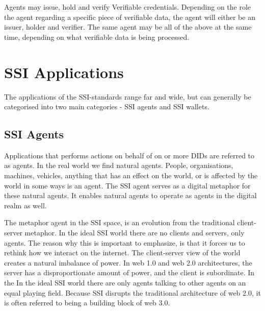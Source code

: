 Agents may issue, hold and verify Verifiable credentials. Depending on
the role the agent regarding a specific piece of verifiable data, the
agent will either be an issuer, holder and verifier. The same agent may
be all of the above at the same time, depending on what verifiable data
is being processed.





\hypertarget{ssi-applications}{%
\section{SSI Applications}\label{ssi-applications}}

The applications of the SSI-standards range far and wide, but can
generally be categorised into two main categories - SSI agents and SSI
wallets.

\hypertarget{ssi-agents}{%
\subsection{SSI Agents}\label{ssi-agents}}

Applications that performs actions on behalf of on or more DIDs are
referred to as agents. In the real world we find natural agents. People,
organisations, machines, vehicles, anything that has an effect on the
world, or is affected by the world in some ways is an agent. The SSI
agent serves as a digital metaphor for these natural agents. It enables
natural agents to operate as agents in the digital realm as well.

The metaphor agent in the SSI space, is an evolution from the
traditional client-server metaphor. In the ideal SSI world there are no
clients and servers, only agents. The reason why this is important to
emphasize, is that it forces us to rethink how we interact on the internet.
The client-server view of the world creates a natural imbalance of
power. In web 1.0 and web 2.0 architectures, the server has a
disproportionate amount of power, and the client is subordinate. In the
In the ideal SSI world there are only agents talking to other agents on
an equal playing field. Because SSI disrupts the traditional architecture of
web 2.0, it is often referred to being a building block of web 3.0.



\pagebreak



